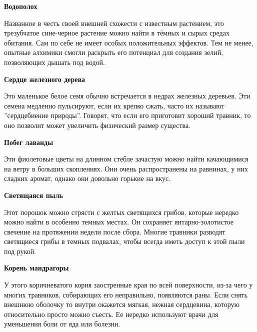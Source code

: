 \documentclass[a4paper, 9pt, twocolumn]{book}
\begin{document}
	\medspace
	
	\noindent \textbf{Водополох}
	
	\smallskip
	
	\noindent Названное в честь своей внешней схожести с известным растением, это трезубчатое сине-черное растение можно найти в тёмных и сырых средах обитания. Сам по себе не имеет особых положительных эффектов. Тем не менее, опытные алхимики смогли раскрыть его потенциал для создания зелий, позволяющих дышать под водой.
	
	\medspace
	
	\noindent \textbf{Сердце железного дерева}
	
	\smallskip
	
	\noindent Это маленькое белое семя обычно встречается в недрах железных деревьев. Эти семена медленно пульсируют, если их крепко сжать, часто их называют ''сердцебиение природы''. Говорят, что если его приготовит хороший травник, то оно позволит может увеличить физический размер существа.
	
	\medspace
	
	\noindent \textbf{Побег лаванды}
	
	\smallskip
	
	\noindent Эти фиолетовые цветы на длинном стебле зачастую можно найти качающимися на ветру в больших скоплениях. Они очень распространены на равнинах, у них сладких аромат, однако они довольно горькие на вкус.

	\medspace
	
	\noindent \textbf{Светящаяся пыль}
	
	\noindent Этот порошок можно стрясти с желтых светящихся грибов, которые нередко можно найти в особенно темных местах. Он сохраняет янтарно-золотистое свечение на протяжении недели после сбора. Многие травники разводят светящиеся грибы в темных подвалах, чтобы всегда иметь доступ к этой пыли под рукой.
	
	\medspace
	
	\noindent \textbf{Корень мандрагоры}
	
	\smallskip
	
	\noindent  У этого коричневатого корня заостренные края по всей поверхности, из-за чего у многих травников, собирающих его неправильно, появляются раны. Если снять внешнюю оболочку то внутри окажется мягкая, нежная сердцевина, которую относительно просто можно съесть. Ее нередко используют врачи для уменьшения боли от яда или болезни.
	
	\medspace
	
\end{document}

